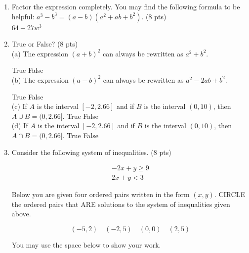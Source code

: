 \documentclass{ximera}
\begin{document}
\begin{enumerate}
$$z^{4}-81$$

\item Factor the expression completely. You may find the following formula to be helpful: $a^{3}-b^{3}=(a-b)\left(a^{2}+a b+b^{2}\right)$. (8 pts)\\
$64-27 w^{3}$

\item True or False? (8 pts)\\
(a) The expression $(a+b)^{2}$ can always be rewritten as $a^{2}+b^{2}$.

True False\\
(b) The expression $(a-b)^{2}$ can always be rewritten as $a^{2}-2 a b+b^{2}$.

True False\\
(c) If $A$ is the interval $[-2,2.66]$ and if $B$ is the interval $(0,10)$, then $A \cup B=(0,2.66]$. True False\\
(d) If $A$ is the interval $[-2,2.66]$ and if $B$ is the interval $(0,10)$, then $A \cap B=(0,2.66]$. True False

\item Consider the following system of inequalities. (8 pts)

$$\begin{array}{r}
-2 x+y \geq 9 \\
2 x+y<3
\end{array}$$

Below you are given four ordered pairs written in the form $(x, y)$. CIRCLE the ordered pairs that ARE solutions to the system of inequalities given above.

$$(-5,2) \quad(-2,5) \quad(0,0) \quad(2,5)$$

You may use the space below to show your work.
\end{enumerate}
\end{document}
